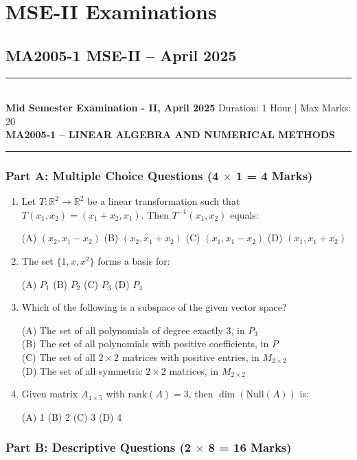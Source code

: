 \documentclass[11pt,a4paper]{article}
\newcommand{\examheader}[4]{
\noindent\rule{\textwidth}{0.5pt}\\
\textbf{#1} \hfill Duration: #3 | Max Marks: #4\\
\textbf{#2}\\
\rule{\textwidth}{0.5pt}
\vspace{0.2cm}
}
\begin{document}
\section{MSE-II Examinations}

\subsection{MA2005-1 MSE-II -- April 2025}
\examheader{Mid Semester Examination - II, April 2025}{MA2005-1 -- LINEAR ALGEBRA AND NUMERICAL METHODS}{1 Hour}{20}

\subsubsection*{Part A: Multiple Choice Questions (4 $\times$ 1 = 4 Marks)}

\begin{enumerate}
\item Let $T: \mathbb{R}^2 \to \mathbb{R}^2$ be a linear transformation such that $T(x_1, x_2) = (x_1 + x_2, x_1)$. Then $T^{-1}(x_1, x_2)$ equals:

(A) $(x_2, x_1 - x_2)$ \quad (B) $(x_2, x_1 + x_2)$ \quad (C) $(x_1, x_1 - x_2)$ \quad (D) $(x_1, x_1 + x_2)$

\item The set $\{1, x, x^2\}$ forms a basis for:

(A) $P_1$ \quad (B) $P_2$ \quad (C) $P_3$ \quad (D) $P_4$

\item Which of the following is a subspace of the given vector space?

(A) The set of all polynomials of degree exactly 3, in $P_3$\\
(B) The set of all polynomials with positive coefficients, in $P$\\
(C) The set of all $2 \times 2$ matrices with positive entries, in $M_{2 \times 2}$\\
(D) The set of all symmetric $2 \times 2$ matrices, in $M_{2 \times 2}$

\item Given matrix $A_{4 \times 5}$ with $\text{rank}(A) = 3$, then $\dim(\text{Null}(A))$ is:

(A) 1 \quad (B) 2 \quad (C) 3 \quad (D) 4
\end{enumerate}

\subsubsection*{Part B: Descriptive Questions (2 $\times$ 8 = 16 Marks)}
\end{document}
